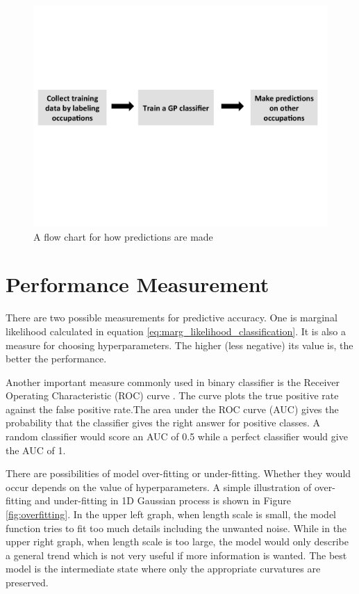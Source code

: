 \documentclass[11pt]{report}
\numberwithin{equation}{chapter}
\begin{document}
\begin{spacing}{2}
\begin{figure}[htb]
\centering
\includegraphics[scale=0.6]{prediction_flow.pdf}
\caption{A flow chart for how predictions are made}
\label{fig:flow}
\end{figure}
 

\section{Performance Measurement} 
There are two possible measurements for predictive accuracy. One is marginal likelihood calculated in equation \ref{eq:marg_likelihood_classification}. It is also a measure for choosing hyperparameters. The higher (less negative) its value is, the better the performance. 

Another important measure commonly used in binary classifier is the Receiver Operating Characteristic (ROC) curve \cite{hanley1982meaning}\cite{bradley1997use}. The curve plots the true positive rate against the false positive rate.The area under the ROC curve (AUC) gives the probability that the classifier gives the right answer for positive classes. A random classifier would score an AUC of 0.5 while a perfect classifier would give the AUC of 1. 

There are possibilities of model over-fitting or under-fitting. Whether they would occur depends on the value of hyperparameters. A simple illustration of over-fitting and under-fitting in 1D Gaussian process is shown in Figure \ref{fig:overfitting}. In the upper left graph, when length scale is small, the model function tries to fit too much details including the unwanted noise. While in the upper right graph, when length scale is too large, the model would only describe a general trend which is not very useful if more information is wanted. The best model is the intermediate state where only the appropriate curvatures are preserved. 


\end{spacing}
\end{document}
